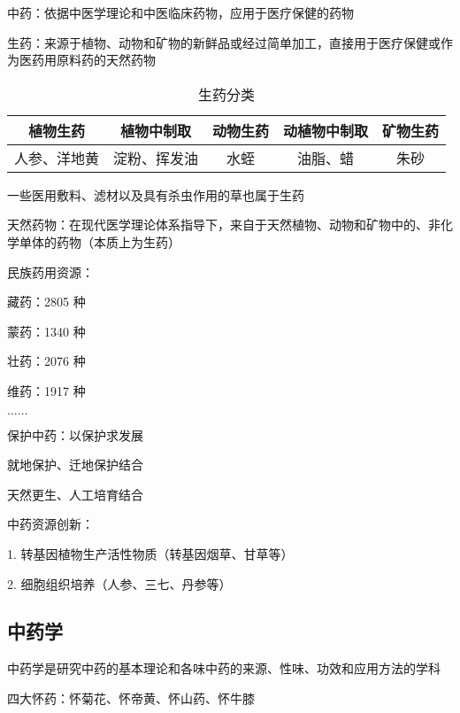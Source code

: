\begin{defi}
    中药：依据中医学理论和中医临床药物，应用于医疗保健的药物
\end{defi}
\begin{defi}
    生药：来源于植物、动物和矿物的新鲜品或经过简单加工，直接用于医疗保健或作为医药用原料药的天然药物
\end{defi}
\begin{table}[htpb]
    \centering
    \caption{生药分类}
    \label{tab:生药分类}
    \begin{tabular}{ccccc}
    \toprule
    植物生药 & 植物中制取 & 动物生药 & 动植物中制取 & 矿物生药\\
    \midrule
    人参、洋地黄 & 淀粉、挥发油 & 水蛭 & 油脂、蜡 & 朱砂\\
    \bottomrule
    \end{tabular}
\end{table}
\begin{notation}
    一些医用敷料、滤材以及具有杀虫作用的草也属于生药
\end{notation}
\begin{defi}
    天然药物：在现代医学理论体系指导下，来自于天然植物、动物和矿物中的、非化学单体的药物（本质上为生药）
\end{defi}

民族药用资源：

藏药：2805 种

蒙药：1340 种

壮药：2076 种

维药：1917 种

$\ldots\ldots$
\begin{notation}
    保护中药：以保护求发展

    就地保护、迁地保护结合

    天然更生、人工培育结合
\end{notation}
\begin{notation}
    中药资源创新：

    1. 转基因植物生产活性物质（转基因烟草、甘草等）
    
    2. 细胞组织培养（人参、三七、丹参等）
\end{notation}
\subsection{中药学}%
\label{sub:中药学}
\begin{defi}
    中药学是研究中药的基本理论和各味中药的来源、性味、功效和应用方法的学科
\end{defi}
\begin{notation}
    四大怀药：怀菊花、怀帝黄、怀山药、怀牛膝
\end{notation}
